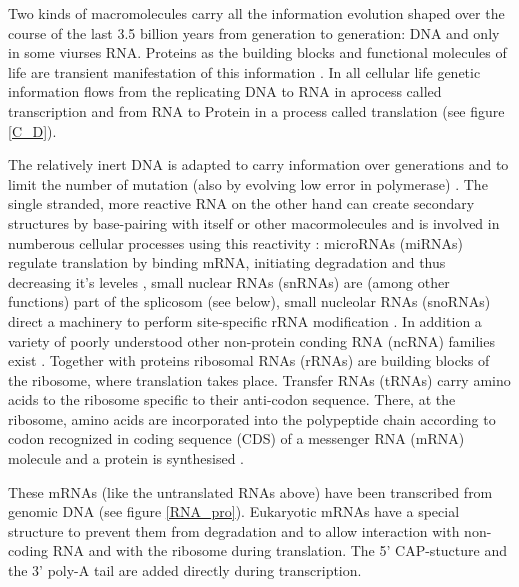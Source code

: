 Two kinds of macromolecules carry all the information evolution shaped
over the course of the last 3.5 billion years from generation to
generation: DNA and only in some viurses RNA. Proteins as the building
blocks and functional molecules of life are transient manifestation of
this information \cite{crick1958biological}. In all cellular life
genetic information flows from the replicating DNA to RNA in aprocess
called transcription and from RNA to Protein in a process called
translation \cite{pmid5422595} (see figure \ref{C_D}).

The relatively inert DNA is adapted to carry information over
generations and to limit the number of mutation (also by evolving low
error in polymerase) \cite{pmid21821597}. The single stranded, more
reactive RNA on the other hand can create secondary structures by
base-pairing with itself or other macormolecules and is involved in
numberous cellular processes using this reactivity
\cite{pmid21850044}: microRNAs (miRNAs) regulate translation by
binding mRNA, initiating degradation and thus decreasing it's leveles
\cite{pmid20703300,pmid11679654}, small nuclear RNAs (snRNAs) are
(among other functions) part of the splicosom (see below), small
nucleolar RNAs (snoRNAs) direct a machinery to perform site-specific
rRNA modification \cite{pmid19446021}. In addition a variety of poorly
understood other non-protein conding RNA (ncRNA) families exist
\cite{pmid16344563}. Together with proteins ribosomal RNAs (rRNAs) are
building blocks of the ribosome, where translation takes
place. Transfer RNAs (tRNAs) carry amino acids to the ribosome
specific to their anti-codon sequence. There, at the ribosome, amino
acids are incorporated into the polypeptide chain according to codon
recognized in coding sequence (CDS) of a messenger RNA (mRNA) molecule
and a protein is synthesised \cite{pmid4887876}.

These mRNAs (like the untranslated RNAs above) have been transcribed
from genomic DNA (see figure \ref{RNA_pro}). Eukaryotic mRNAs have a
special structure to prevent them from degradation and to allow
interaction with non-coding RNA and with the ribosome during
translation. The 5' CAP-stucture and the 3' poly-A tail are added
directly during transcription.


